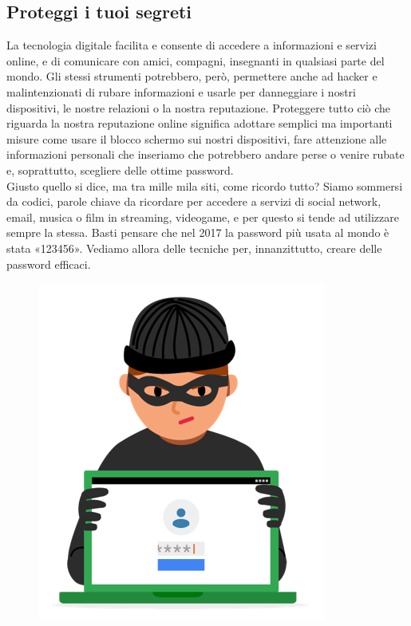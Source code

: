 \documentclass{article}
\begin{document}
\subsection{Proteggi i tuoi segreti}
La tecnologia digitale facilita e consente di accedere a informazioni e servizi online, e di comunicare con amici, compagni, insegnanti in qualsiasi parte del mondo. Gli stessi strumenti potrebbero, però, permettere anche ad hacker e malintenzionati di rubare informazioni e usarle per danneggiare i nostri dispositivi, le nostre relazioni o la nostra reputazione. Proteggere tutto ciò che riguarda la nostra reputazione online significa adottare semplici ma importanti misure come usare il blocco schermo sui nostri dispositivi, fare attenzione alle informazioni personali che inseriamo che potrebbero andare perse o venire rubate e, soprattutto, scegliere delle ottime password.\\
Giusto quello si dice, ma tra mille mila siti, come ricordo tutto? Siamo sommersi da codici, parole chiave da ricordare per accedere a servizi di social network, email, musica o film in streaming, videogame, e per questo si tende ad utilizzare sempre la stessa. Basti pensare che nel 2017 la password più usata al mondo è stata «123456». Vediamo allora delle tecniche per, innanzittutto, creare delle password efficaci.
\begin{figure}[h!]
	\centering
	\includegraphics[scale=0.5]{Thieg.png}
\end{figure}
\end{document}
